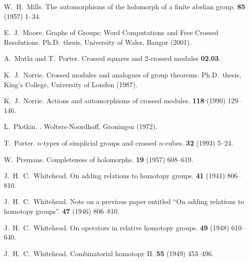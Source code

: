 \begin{thebibliography}{notesdev}
W.~H.~Mills.
\newblock The automorphisms of the holomorph of a finite abelian group.
 {\bf 85} (1957) 1--34.

E.~J.~Moore.
\newblock Graphs of Groups: Word Computations and Free Crossed Resolutions.
\newblock Ph.{D}.~thesis, University of Wales, Bangor (2001).

A.~Mutlu and T.~Porter.
\newblock Crossed squares and $2$-crossed modules {\bf 02.03}.

K.~J.~Norrie.
\newblock Crossed modules and analogues of group theorems.
\newblock Ph.{D}.~thesis, King's College, University of London (1987).

K.~J.~Norrie.
\newblock Actions and automorphisms of crossed modules.
 {\bf 118} (1990) 129--146.

L.~Plotkin.
.
\newblock Wolters-Noordhoff, Groningen (1972).

T.~Porter.
\newblock $n$-types of simplicial groups and crossed $n$-cubes.
 {\bf 32} (1993) 5--24.

W.~Premans.
\newblock Completeness of holomorphs.
 {\bf 19} (1957) 608--619.

J.~H.~C.~Whitehead.
\newblock On adding relations to homotopy groups.
 {\bf 41} (1941) 806--810.

J.~H.~C.~Whitehead.
\newblock Note on a previous paper entitled ``On adding relations to homotopy
  groups''.
 {\bf 47} (1946) 806--810.

J.~H.~C.~Whitehead.
\newblock On operators in relative homotopy groups.
 {\bf 49} (1948) 610--640.

J.~H.~C.~Whitehead.
\newblock Combinatorial homotopy {I}{I}.
 {\bf 55} (1949) 453--496.

\end{thebibliography}

 

